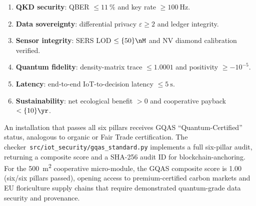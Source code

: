 \documentclass[11pt,a4paper]{article}
\begin{document}
\begin{enumerate}[label=(\roman*)]
\item \textbf{QKD security}: QBER $\leq \qty{11}{\percent}$ and key rate $\geq
\qty{100}{\Hz}$.
\item \textbf{Data sovereignty}: differential privacy $\varepsilon \geq 2$
and ledger integrity.
\item \textbf{Sensor integrity}: SERS LOD $\leq \qty{50}{\nM}$ and NV
diamond calibration verified.
\item \textbf{Quantum fidelity}: density-matrix trace $\leq 1.0001$ and
positivity $\geq -10^{-5}$.
\item \textbf{Latency}: end-to-end IoT-to-decision latency $\leq
\qty{5}{\s}$.
\item \textbf{Sustainability}: net ecological benefit $> 0$ and
cooperative payback $< \qty{10}{\yr}$.
\end{enumerate}

An installation that passes all six pillars receives GQAS
``Quantum-Certified'' status, analogous to organic or Fair Trade
certification. The checker~\texttt{src/iot\_security/gqas\_standard.py}
implements a full six-pillar audit, returning a composite score and a
SHA-256 audit ID for blockchain-anchoring. For the
\qty{500}{\m\squared} cooperative micro-module, the GQAS composite score
is 1.00 (six/six pillars passed), opening access to premium-certified
carbon markets and EU floriculture supply chains that require
demonstrated quantum-grade data security and provenance.





\end{document}
